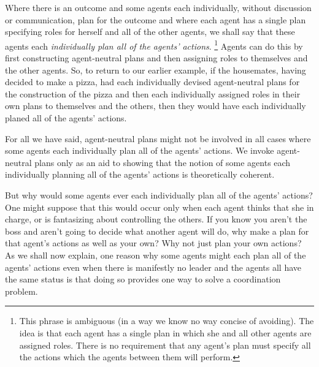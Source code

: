 \documentclass[12pt,\papersize]{extarticle}
\begin{document}
Where there is an outcome and some agents each individually,
without discussion or communication,
plan for the outcome 
and where each agent has a single plan specifying roles for herself and all of the other agents,
we shall say that these agents each \emph{individually plan all of the agents' actions}.%
\footnote{
This phrase is ambiguous (in a way we know  no way concise of avoiding).
The idea is that each agent has a single plan in which she and  all other agents are assigned roles.
There is no requirement that any agent's plan must specify all the actions which the agents between them will perform.
}
Agents can do this by first constructing agent-neutral plans and then assigning roles to themselves and the other agents.
So, to return to our earlier example, 
 if the housemates, having decided to make a pizza, had each individually devised  agent-neutral plans for the construction of the pizza and then each individually assigned roles in their own plans to themselves and the others, 
then they would have each individually planed all of the agents' actions.

For all we have said,  agent-neutral plans might not be involved in all cases where some agents each individually plan all of the agents' actions.
We invoke agent-neutral plans only as an aid to showing that the notion of some 
agents each individually planning all of the agents' actions is theoretically coherent.


But why would some agents ever each individually plan all of the agents' actions?
One might suppose that this would occur only when each agent thinks that she in charge, or is fantasizing about controlling the others.
If you know you aren't the boss and aren't going to decide what another agent will do, why  make a plan for that agent's actions as well as your own?
Why not just plan your own actions?
As we shall now explain, 
one reason why some agents might each plan all of the agents' actions 
	even when there is manifestly no leader and the agents all have the same status
	is that doing so provides one way to solve a coordination problem.
\end{document}

